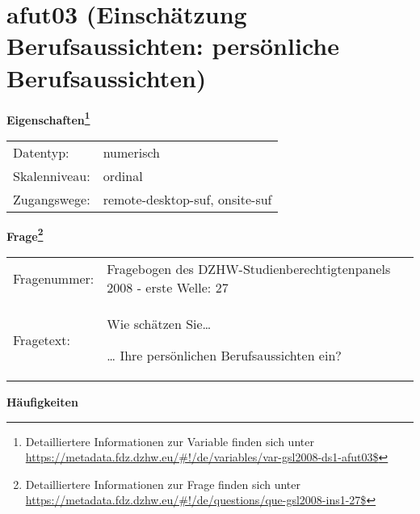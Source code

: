 
    \setcounter{footnote}{0}

    \vspace*{-1.8cm}
	\section{afut03 (Einschätzung Berufsaussichten: persönliche Berufsaussichten)}
	\label{section:afut03}



    \vspace*{0.5cm}
    \noindent\textbf{Eigenschaften\footnote{Detailliertere Informationen zur Variable finden sich unter
		\url{https://metadata.fdz.dzhw.eu/\#!/de/variables/var-gsl2008-ds1-afut03$}}}\\
	\begin{tabularx}{\hsize}{@{}lX}
	Datentyp: & numerisch \\
	Skalenniveau: & ordinal \\
	Zugangswege: &
	  remote-desktop-suf, 
	  onsite-suf
 \\
    \end{tabularx}



				\vspace*{0.5cm}
                \noindent\textbf{Frage\footnote{Detailliertere Informationen zur Frage finden sich unter
		              \url{https://metadata.fdz.dzhw.eu/\#!/de/questions/que-gsl2008-ins1-27$}}}\\
				\begin{tabularx}{\hsize}{@{}lX}
					Fragenummer: &
					  Fragebogen des DZHW-Studienberechtigtenpanels 2008 - erste Welle:
					  27
 \\
					Fragetext: & Wie schätzen Sie…\par  … Ihre persönlichen Berufsaussichten ein? \\
				\end{tabularx}





        		\vspace*{0.5cm}
                \noindent\textbf{Häufigkeiten}

